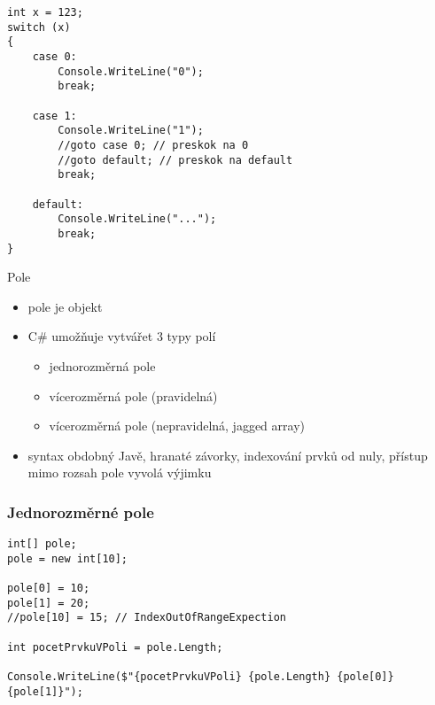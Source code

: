 \begin{frame}[fragile]
\begin{yesblock}
\begin{lstlisting}
int x = 123;
switch (x)
{
    case 0: 
        Console.WriteLine("0");
        break;

    case 1:
        Console.WriteLine("1");
        //goto case 0; // preskok na 0
        //goto default; // preskok na default
        break;

    default:
        Console.WriteLine("...");
        break;
}
\end{lstlisting}
\end{yesblock}
\end{frame}





\begin{frame}[fragile]
\begin{block}{Pole}
\begin{itemize}
\item pole je objekt
\item C\# umožňuje vytvářet 3 typy polí
\begin{itemize}
\item jednorozměrná pole
\item vícerozměrná pole (pravidelná)
\item vícerozměrná pole (nepravidelná, jagged array)
\end{itemize}

\item syntax obdobný Javě, hranaté závorky, indexování prvků od nuly, přístup mimo rozsah pole vyvolá výjimku
\end{itemize}
\end{block}
\end{frame}

\begin{frame}[fragile]
\frametitle{Jednorozměrné pole}
\begin{yesblock}
\begin{lstlisting}
int[] pole;
pole = new int[10];

pole[0] = 10;
pole[1] = 20;
//pole[10] = 15; // IndexOutOfRangeExpection

int pocetPrvkuVPoli = pole.Length;

Console.WriteLine($"{pocetPrvkuVPoli} {pole.Length} {pole[0]} {pole[1]}");
\end{lstlisting}
\end{yesblock}
\end{frame}



